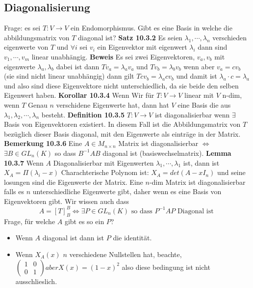 \documentclass{article}
\begin{document}
\subsection{Diagonalisierung} Frage: es sei $T:V\rightarrow V$ ein Endomorphismus. Gibt es eine Basis in welche die abbildungsmatrix von $T$  diagonal ist?
\newline\textbf{Satz 10.3.2} Es seien $\lambda_1,\cdots,\lambda_n$ verschieden eigenwerte von $T$ und $\forall i$ sei $v_i$ ein Eigenvektor mit eigenwert $\lambda_i$ dann sind $v_1,\cdots,v_m$ linear unabhängig.\newline
\textbf{Beweis} Es sei zwei Eigenvektoren, $v_a, v_b$ mit eigenwerte $\lambda_a,\lambda_b$ dabei ist dann $Tv_a=\lambda_av_a$ und $Tv_b=\lambda_bv_b$ wenn aber $v_a=cv_b$ (sie sind nicht linear unabhängig) dann gilt $Tcv_b=\lambda_acv_b$ und damit ist $\lambda_a\cdot c=\lambda_a$ und also sind diese Eigenvektore nicht unterschiedlich, da sie beide den selben Eigenwert haben.
\newline
\textbf{Korollar 10.3.4} Wenn Wir für $T:V\rightarrow V$ linear mit $V$ n-dim, wenn $T$ Genau $n$ verschidene Eigenwerte hat, dann hat $V$ eine Basis die aus $\lambda_1,\lambda_2,\cdots,\lambda_n$ besteht.\newline
\textbf{Definition 10.3.5} $T:V\rightarrow V$ ist diagonalisierbar wenn $\exists$ Basis von Eigenvektoren existiert.
In diesem Fall ist die Abbildungsmatrix von $T$ bezüglich dieser Basis diagonal, mit den Eigenwerte als einträge in der Matrix.\newline
\textbf{Bemerkung 10.3.6} Eine $A\in M_{n\times n}$ Matrix ist diagonalisierbar $\Leftrightarrow$ $\exists B\in GL_n(K)$ so dass $B^{-1}AB$ diagonal ist (basiswechselmatrix).
\newline \textbf{Lemma 10.3.7} Wenn $A$ Diagonalisierbar mit Eigenwerten $\lambda_1,\cdots,\lambda_1$ ist, dann ist $X_A=\Pi(\lambda_i-x)$
\newline
Charachterische Polynom ist: $X_A=det(A-xI_n)$ und seine losungen sind die Eigenwerte der Matrix.\newline
Eine $n$-dim Matrix ist diagonalisierbar falls es $n$ unterschiedliche Eigenwerte gibt, daher wenn es eine Basis von Eigenvektoren gibt. Wir wissen auch dass
\[A=[T]^B_B\Leftrightarrow\exists P\in GL_n(K) \text{ so dass } P^{-1}AP \text{ Diagonal ist }\]
Frage, für welche $A$ gibt es so ein $P$?\begin{itemize}
  \item{Wenn $A$ diagonal ist dann ist $P$ die identität.}
  \item{Wenn $X_A(x)$ $n$ verschiedene Nullstellen hat, beachte, $\begin{pmatrix}1&0\\0&1\end{pmatrix} aber X(x)=(1-x)^2$ also diese bedingung ist nicht ausschlieslich.}
\end{itemize}
\end{document}
